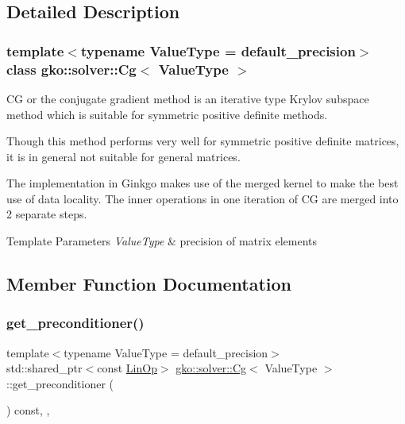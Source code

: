 \subsection{Detailed Description}
\subsubsection*{template$<$typename Value\+Type = default\+\_\+precision$>$\newline
class gko\+::solver\+::\+Cg$<$ Value\+Type $>$}

CG or the conjugate gradient method is an iterative type Krylov subspace method which is suitable for symmetric positive definite methods. 

Though this method performs very well for symmetric positive definite matrices, it is in general not suitable for general matrices.

The implementation in Ginkgo makes use of the merged kernel to make the best use of data locality. The inner operations in one iteration of CG are merged into 2 separate steps.


\begin{DoxyTemplParams}{Template Parameters}
{\em Value\+Type} & precision of matrix elements \\
\hline
\end{DoxyTemplParams}


\subsection{Member Function Documentation}
\mbox{\label{classgko_1_1solver_1_1Cg_a797544ecc8d86d2798014e7f5f5baf4f}} 
\subsubsection{\texorpdfstring{get\+\_\+preconditioner()}{get\_preconditioner()}}
{\footnotesize\ttfamily template$<$typename Value\+Type  = default\+\_\+precision$>$ \\
std\+::shared\+\_\+ptr$<$const \hyperlink{classgko_1_1LinOp}{Lin\+Op}$>$ \hyperlink{classgko_1_1solver_1_1Cg}{gko\+::solver\+::\+Cg}$<$ Value\+Type $>$\+::get\+\_\+preconditioner (\begin{DoxyParamCaption}{ }\end{DoxyParamCaption}) const\hspace{0.3cm}{\ttfamily [inline]}, {\ttfamily [override]}, {\ttfamily [virtual]}}



